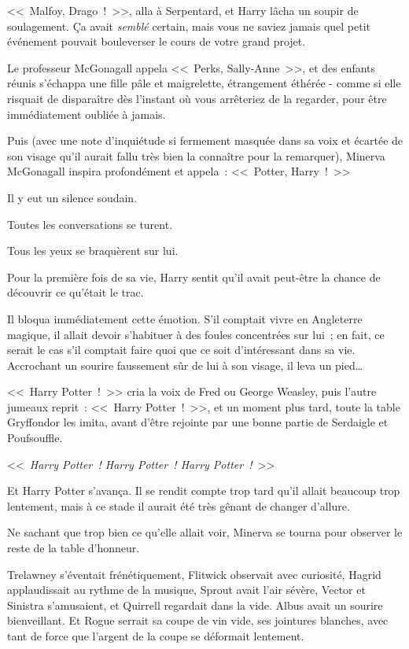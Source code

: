 <<~Malfoy, Drago~!~>>, alla à Serpentard, et Harry lâcha un soupir de soulagement. Ça avait \emph{semblé} certain, mais vous ne saviez jamais quel petit événement pouvait bouleverser le cours de votre grand projet.

Le professeur McGonagall appela <<~Perks, Sally-Anne~>>, et des enfants réunis s'échappa une fille pâle et maigrelette, étrangement éthérée - comme si elle risquait de disparaître dès l'instant où vous arrêteriez de la regarder, pour être immédiatement oubliée à jamais.

Puis (avec une note d'inquiétude si fermement masquée dans sa voix et écartée de son visage qu'il aurait fallu très bien la connaître pour la remarquer), Minerva McGonagall inspira profondément et appela~: <<~Potter, Harry~!~>>

Il y eut un silence soudain.

Toutes les conversations se turent.

Tous les yeux se braquèrent sur lui.

Pour la première fois de sa vie, Harry sentit qu'il avait peut-être la chance de découvrir ce qu'était le trac.

Il bloqua immédiatement cette émotion. S'il comptait vivre en Angleterre magique, il allait devoir s'habituer à des foules concentrées sur lui~; en fait, ce serait le cas s'il comptait faire quoi que ce soit d'intéressant dans sa vie. Accrochant un sourire faussement sûr de lui à son visage, il leva un pied…

<<~Harry Potter~!~>> cria la voix de Fred ou George Weasley, puis l'autre jumeaux reprit~: <<~Harry Potter~!~>>, et un moment plus tard, toute la table Gryffondor les imita, avant d'être rejointe par une bonne partie de Serdaigle et Poufsouffle.

<<~\emph{Harry Potter~! Harry Potter~! Harry Potter~!}~>>

Et Harry Potter s'avança. Il se rendit compte trop tard qu'il allait beaucoup trop lentement, mais à ce stade il aurait été très gênant de changer d'allure.

\later

Ne sachant que trop bien ce qu'elle allait voir, Minerva se tourna pour observer le reste de la table d'honneur.

Trelawney s'éventait frénétiquement, Flitwick observait avec curiosité, Hagrid applaudissait au rythme de la musique, Sprout avait l'air sévère, Vector et Sinistra s'amusaient, et Quirrell regardait dans la vide. Albus avait un sourire bienveillant. Et Rogue serrait sa coupe de vin vide, ses jointures blanches, avec tant de force que l'argent de la coupe se déformait lentement.


